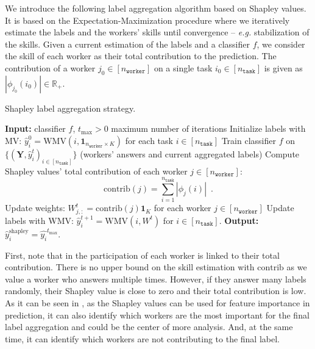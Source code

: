 \documentclass{cap2024}
\begin{document}
We introduce the following label aggregation algorithm based on Shapley values.
It is based on the Expectation-Maximization procedure where we iteratively estimate the labels and the workers' skills until convergence -- \emph{e.g.} stabilization of the skills.
Given a current estimation of the labels and a classifier $f$, we consider the skill of each worker as their total contribution to the prediction.
The contribution of a worker $j_0\in[n_\texttt{worker}]$ on a single task $i_0\in [n_\texttt{task}]$ is given as $|\phi_{j_0}(i_0)|\in\mathbb{R}_+$.

\begin{algorithm}[tbh]
  \caption{Shapley label aggregation strategy.}\label{alg:shap}
  \begin{algorithmic}[1]
    \State \textbf{Input:} classifier $f$, $t_{\max}>0$ maximum number of iterations
  \State Initialize labels with MV: $\hat{y}_i^0 = \mathrm{WMV}(i, \mathbf{1}_{n_\texttt{worker}\times K})$ for each task $i\in [n_\texttt{task}]$
        \State Train classifier $f$ on $\{(\mathbf{Y}, \hat{y}_i^t)_{i\in [n_\texttt{task}]}\}$ (workers' answers and current aggregated labels)
        \State Compute Shapley values' total contribution of each worker $j\in [n_\texttt{worker}]$:
        \[ \mathrm{contrib}(j) = \sum_{i=1}^{n_\texttt{task}} |\phi_{j}(i)|\enspace. \]
        \State Update weights: $W^t_{j,:} = \mathrm{contrib}(j)\mathbf{1}_K$ for each worker $j\in [n_\texttt{worker}]$
        \State Update labels with WMV: $\hat{y}_i^{t+1} = \mathrm{WMV}(i, W^{t})$ for $i\in[n_\texttt{task}]$.
    \EndFor
    \State \textbf{Output:} $\hat{y}_i^\text{shapley} = \hat{y_i}^{t_{\max}}$.
  \end{algorithmic}
  \end{algorithm}

First, note that in  the participation of each worker is linked to their total contribution. There is no upper bound on the skill estimation with $\mathrm{contrib}$ as we value a worker who answers multiple times.
However, if they answer many labels randomly, their Shapley value is close to zero and their total contribution is low.
As it can be seen in , as the Shapley values can be used for feature importance in prediction, it can also identify which workers are the most important for the final label aggregation and could be the center of more analysis.
And, at the same time, it can identify which workers are not contributing to the final label.
\end{document}
